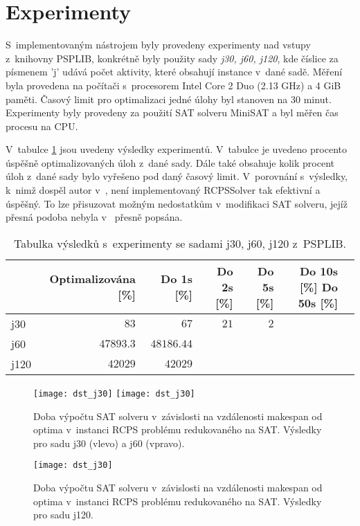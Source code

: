 \documentclass[a4paper, 12pt]{article}
\begin{document}
\section{Experimenty}
S~implementovaným nástrojem byly provedeny experimenty nad vstupy
z~knihovny PSPLIB, konkrétně byly použity sady \emph{j30, j60, j120}, kde
číslice za písmenem 'j' udává počet aktivity, které obsahují instance v~dané sadě.
Měření byla provedena na počítači s~procesorem Intel Core 2 Duo (2.13 GHz) a 4 GiB paměti.
Časový limit pro optimalizaci jedné úlohy byl stanoven na $30$ minut.
Experimenty byly provedeny za použití SAT solveru MiniSAT a byl měřen čas
procesu na CPU.

V~tabulce \ref{table:jreses} jsou uvedeny výsledky experimentů.
V~tabulce je uvedeno procento úspěšně optimalizovaných úloh z~dané sady.
Dále také obsahuje kolik procent úloh z~dané sady bylo vyřešeno pod daný časový limit.
V~porovnání s~výsledky, k~nimž dospěl autor v~\cite{horbach:10}, není implementovaný
RCPSSolver tak efektivní a úspěšný.
To lze přisuzovat možným nedostatkům v~modifikaci SAT solveru, jejíž přesná podoba nebyla
v~\cite{horbach:10} přesně popsána.

\begin{table}[tb]
\begin{center}
  \begin{tabular}{ | l | r | r | r | r | r | r |}
   \hline
    & \textbf{Optimalizována [\%]} & Do 1s [\%] & Do 2s [\%] & Do 5s [\%] & Do 10s [\%] Do 50s [\%]\\ \hline \hline
    j30 &$83$ & $67$ & $21$  &$2$ & \\ \hline
    j60 & $47893.3$ & $48186.44$ & & & \\ \hline
    j120 & $42 029$ & $42 029$ & & & \\ \hline
   \end{tabular}
   \caption{Tabulka výsledků s~experimenty se sadami j30, j60, j120 z~PSPLIB.}
   \label{table:jreses}
\end{center}
\end{table}

\begin{figure}[tb]
    \texttt{[image: dst\_j30]}
    \texttt{[image: dst\_j30]}
    \caption{Doba výpočtu SAT solveru v~závislosti na vzdálenosti makespan od optima v~instanci RCPS problému redukovaného na SAT.
    Výsledky pro sadu j30 (vlevo) a j60 (vpravo).}
    \label{pic:j30}
\end{figure}
\begin{figure}[tb]
    \begin{center}
    \texttt{[image: dst\_j30]}
    \end{center}
    \caption{Doba výpočtu SAT solveru v~závislosti na vzdálenosti makespan od optima v~instanci RCPS problému redukovaného na SAT.
    Výsledky pro sadu j120.}
    \label{pic:j120}
\end{figure}
\end{document}
